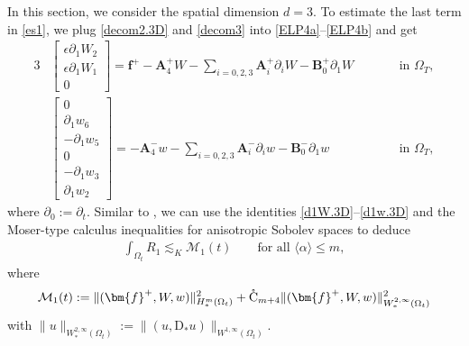 \documentclass[twoside,11pt]{article}
\numberwithin{equation}{section}
\def\p{\partial}
\begin{document}
In this section, we consider the spatial dimension $d=3$.
To estimate the last term in \eqref{es1},
we plug \eqref{decom2.3D} and \eqref{decom3} into \eqref{ELP4a}--\eqref{ELP4b} and get
\begin{alignat}{3}
	\label{d1W.3D}
	&	\begin{bmatrix}
		\epsilon \p_1 W_2\\   \epsilon \p_1 W_1  \\0
	\end{bmatrix}
	=\bm{f}^+-{\bm{A}}_{4}^+ W-\sum_{i=0,2,3}{\bm{A}}_i^+\p_i W-{\bm{B}}_0^+ \p_1W
	\qquad &&\textrm{in }\Omega_{T}	,\\
	\label{d1w.3D}	
	&	\begin{bmatrix}
		0\\ \p_1 w_6\\ -\p_1 w_5\\ 0\\ -\p_1 w_3\\  \p_1w_2
	\end{bmatrix}
	=-{\bm{A}}_4^- w-\sum_{i=0,2,3}{\bm{A}}_i^-\p_i w-{\bm{B}}_0^- \p_1w
	\quad &&\textrm{in }\Omega_{T},
\end{alignat}
where $\p_0:=\p_t$.
Similar to \cite[Lemma 3.5]{TW21MR4201624}, we can use the identities \eqref{d1W.3D}--\eqref{d1w.3D} and the Moser-type calculus inequalities for anisotropic Sobolev spaces %
to deduce
\begin{align}
	\label{R1:es}
	\int_{\Omega_t} {R}_{1}\lesssim_K
	\mathcal{M}_1(t)
	\qquad \textrm{for all } \langle\alpha\rangle \leq m,
\end{align}
where
{\begin{align}
 	\mathcal{M}_1(t):=
{\|}(\bm{f}^+,W,w){\|}_{H_*^m(\Omega_{t})}^2
	+\mathring{\rm C}_{m+4}  \|(\bm{f}^+,W,w)\|_{W_*^{2,\infty}(\Omega_{t})}^2
\label{M1cal:def}	
\end{align}}
with
$
\|u\|_{W_*^{2,\infty}(\Omega_{t}) }:=\|(u, \mathrm{D}_* u)\|_{W^{1,\infty}(\Omega_{t}) }.	
$
\end{document}
